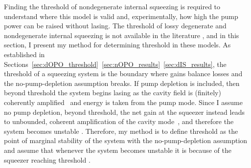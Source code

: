 Finding the threshold of nondegenerate internal squeezing is required to understand where this model is valid and, experimentally, how high the pump power can be raised without lasing.
The threshold of lossy degenerate and nondegenerate internal squeezing is not available in the literature , and in this section, I present my method for determining threshold in these models. %
As established in Sections~\ref{sec:dOPO_threshold}~\ref{sec:nOPO_results}~\ref{sec:dIS_results}, the threshold of a squeezing system is the boundary where gains balance losses and the no-pump-depletion assumption breaks. If pump depletion is included, then beyond threshold the system begins lasing as the cavity field is (finitely) coherently amplified~\cite{} and energy is taken from the pump mode. Since I assume no pump depletion, beyond threshold, the net gain at the squeezer instead leads to unbounded, coherent amplification of the cavity mode~\cite{lasingMaterial}, and therefore the system becomes unstable . Therefore, my method is to define threshold as the point of marginal stability of the system with the no-pump-depletion assumption and assume that whenever the system becomes unstable it is because of the squeezer reaching threshold .


